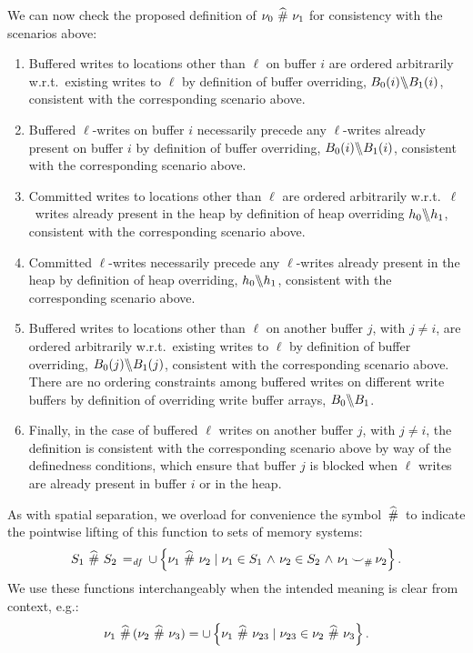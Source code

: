 \documentclass[11pt]{report}
\begin{document}
We can now check the proposed definition of $\nu_0 \operatorname{\,\widehat{\#}\,} \nu_1$ for consistency with the scenarios above: \begin{enumerate}
  \item Buffered writes to locations other than $\ell$ on buffer $i$ are ordered arbitrarily w.r.t.\ existing writes to $\ell$ by definition of buffer overriding, $B_0(i) \backslash\!\!\backslash B_1(i)$, consistent with the corresponding scenario above.

  \item Buffered $\ell$-writes on buffer $i$ necessarily precede any $\ell$-writes already present on buffer $i$ by definition of buffer overriding, $B_0(i) \backslash\!\!\backslash B_1(i)$, consistent with the corresponding scenario above.

  \item Committed writes to locations other than $\ell$ are ordered arbitrarily w.r.t.\ $\ell$~writes already present in the heap by definition of heap overriding $h_0 \backslash\!\!\backslash h_1$, consistent with the corresponding scenario above. 
  
  \item Committed $\ell$-writes necessarily precede any $\ell$-writes already present in the heap by definition of heap overriding, $h_0 \backslash\!\!\backslash h_1$, consistent with the corresponding scenario above. 

  \item Buffered writes to locations other than $\ell$ on another buffer $j$, with $j \neq i$, are ordered arbitrarily w.r.t.\ existing writes to $\ell$ by definition of buffer overriding, $B_0(j) \backslash\!\!\backslash B_1(j)$, consistent with the corresponding scenario above. There are no ordering constraints among buffered writes on different write buffers by definition of overriding write buffer arrays, $B_0 \backslash\!\!\backslash B_1$. 
  
  \item Finally, in the case of buffered $\ell$ writes on another buffer $j$, with $j \neq i$, the definition is consistent with the corresponding scenario above by way of the definedness conditions, which ensure that buffer $j$ is blocked when $\ell$ writes are already present in buffer $i$ or in the heap. 
\end{enumerate}


As with spatial separation, we overload for convenience the symbol $\operatorname{\,\widehat{\#}\,}$ to indicate the pointwise lifting of this function to sets of memory systems: \[ S_1 \operatorname{\,\widehat{\#}\,} S_2 \operatorname{\;=_{\mathit{df}}\;} \cup \left\lbrace \nu_1 \operatorname{\,\widehat{\#}\,} \nu_2 \mid \nu_1 \in S_1 \operatorname{\,\wedge\,} \nu_2 \in S_2 \operatorname{\,\wedge\,} \nu_1 \operatorname{\smile}_\# \nu_2 \right\rbrace.\] We use these functions interchangeably when the intended meaning is clear from context, e.g.: \[ \nu_1 \operatorname{\,\widehat{\#}\,} (\nu_2 \operatorname{\,\widehat{\#}\,} \nu_3) = \cup \left\lbrace \nu_1 \operatorname{\,\widehat{\#}\,} \nu_{23} \mid \nu_{23} \in \nu_2 \operatorname{\,\widehat{\#}\,} \nu_3 \right\rbrace.\] 
\end{document}
